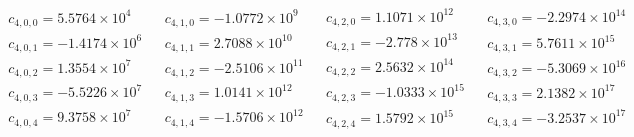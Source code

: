 \documentclass[prd,aps,twocolumn,nofootinbib,showpacs,superscriptaddress]{revtex4-1}
\begin{document}
\[\begin{array}{cccc}
\begin{array}{c}
 c_{4,0,0}=5.5764\times 10^4 \\
 c_{4,0,1}=-1.4174\times 10^6 \\
 c_{4,0,2}=1.3554\times 10^7 \\
 c_{4,0,3}=-5.5226\times 10^7 \\
 c_{4,0,4}=9.3758\times 10^7 \\
\end{array}
 & 
\begin{array}{c}
 c_{4,1,0}=-1.0772\times 10^9 \\
 c_{4,1,1}=2.7088\times 10^{10} \\
 c_{4,1,2}=-2.5106\times 10^{11} \\
 c_{4,1,3}=1.0141\times 10^{12} \\
 c_{4,1,4}=-1.5706\times 10^{12} \\
\end{array}
 & 
\begin{array}{c}
 c_{4,2,0}=1.1071\times 10^{12} \\
 c_{4,2,1}=-2.778\times 10^{13} \\
 c_{4,2,2}=2.5632\times 10^{14} \\
 c_{4,2,3}=-1.0333\times 10^{15} \\
 c_{4,2,4}=1.5792\times 10^{15} \\
\end{array}
 & 
\begin{array}{c}
 c_{4,3,0}=-2.2974\times 10^{14} \\
 c_{4,3,1}=5.7611\times 10^{15} \\
 c_{4,3,2}=-5.3069\times 10^{16} \\
 c_{4,3,3}=2.1382\times 10^{17} \\
 c_{4,3,4}=-3.2537\times 10^{17} \\
\end{array}
 \\
 

\end{array}\]
\end{document}
